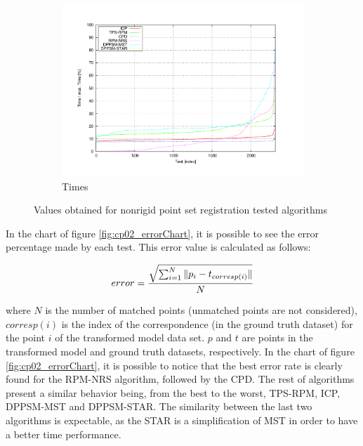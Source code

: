\begin{figure}[t]
        \begin{subfigure}[b]{0.45\columnwidth}
                \centering
                \includegraphics[width=\textwidth, trim=50 45 80 50,clip]{fig20.pdf}
                \caption{Times}
                \label{fig:cp02_timesChart}
        \end{subfigure}%

        \caption{Values obtained for nonrigid point set registration tested algorithms}\label{fig:cp02_chartsRegistration}
\end{figure}

In the chart of figure \ref{fig:cp02_errorChart}, it is possible to see the error percentage made by each test. This 
error value is calculated as follows:

\begin{equation}\label{eq_errorCalculation}
error = { { \sqrt{ \sum_{i=1}^N \| p_i - t_{corresp(i)}\| } } \over N }
\end{equation}

where $N$ is the number of matched points (unmatched points are not considered), $corresp(i)$ is the index of the correspondence (in the ground truth dataset) for the point $i$ of the transformed model data set. $p$ and $t$ are points in the transformed model and ground truth datasets, respectively.
In the chart of figure \ref{fig:cp02_errorChart}, it is possible to notice that the best error rate is clearly found for the RPM-NRS 
algorithm, followed by the CPD.  The rest of algorithms present a similar behavior being, from the best to the 
worst, TPS-RPM, ICP, DPPSM-MST and DPPSM-STAR. The similarity between the last two algorithms is expectable, as the STAR is a simplification of MST in order to have a better time performance.

